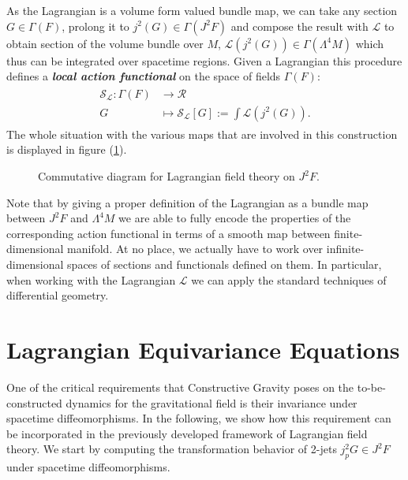 \documentclass[a4paper,12pt, DIV=14, BCOR=5mm, twoside, headsepline, numbers=noenddot]{scrbook}
\begin{document}
As the Lagrangian is a volume form valued bundle map, we can take any section $G \in \Gamma(F)$, prolong it to $j^2(G) \in \Gamma(J^2F)$ and compose the result with $\mathcal{L}$ to obtain section of the volume bundle over $M$, $\mathcal{L}(j^2(G)) \in \Gamma(\Lambda^4M)$ which thus can be integrated over spacetime regions. Given a Lagrangian this procedure defines a \textit{\textbf{local action functional}} on the space of fields $\Gamma(F)$:
\begin{align}
\begin{aligned}
    \mathcal{S}_{\mathcal{L}} : \Gamma(F) &\longrightarrow \mathcal{R} \\
    G &\longmapsto \mathcal{S}_{\mathcal{L}}[G] := \int \mathcal{L}(j^2(G)).
\end{aligned}
\end{align}
The whole situation with the various maps that are involved in this construction is displayed in figure (\ref{diagram1}). 
\begin{figure}[hbt!]
\centering
{}
\caption{Commutative diagram for Lagrangian field theory on $J^2F$.} \label{diagram1}
\end{figure}
Note that by giving a proper definition of the Lagrangian as a bundle map between $J^2F$ and $\Lambda^4M$ we are able to fully encode the properties of the corresponding action functional in terms of a smooth map between finite-dimensional manifold. At no place, we actually have to work over infinite-dimensional spaces of sections and functionals defined on them. In particular, when working with the Lagrangian $\mathcal{L}$ we can apply the standard techniques of differential geometry. 
\section{Lagrangian Equivariance Equations}
One of the critical requirements that Constructive Gravity poses on the to-be-constructed dynamics for the gravitational field is their invariance under spacetime diffeomorphisms. In the following, we show how this requirement can be incorporated in the previously developed framework of Lagrangian field theory. We start by computing the transformation behavior of 2-jets $j_p^2G \in J^2F$ under spacetime diffeomorphisms.
\end{document}
